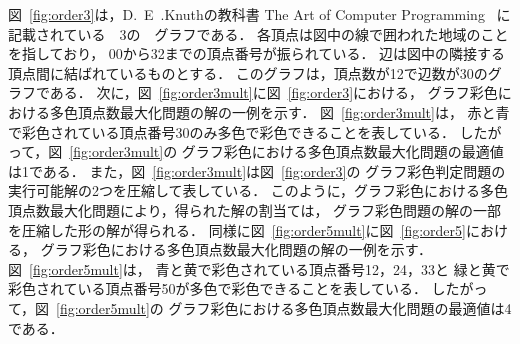 図~\ref{fig:order3}は，D.~E~.Knuthの教科書
The Art of Computer Programming~\cite{Knuth:TAOCP:SAT}
に記載されている~~3の~~グラフである．
各頂点は図中の線で囲われた地域のことを指しており，
00から32までの頂点番号が振られている．
辺は図中の隣接する頂点間に結ばれているものとする．
このグラフは，頂点数が12で辺数が30のグラフである．
次に，図~\ref{fig:order3mult}に図~\ref{fig:order3}における，
グラフ彩色における多色頂点数最大化問題の解の一例を示す．
図~\ref{fig:order3mult}は，
赤と青で彩色されている頂点番号30のみ多色で彩色できることを表している．
したがって，図~\ref{fig:order3mult}の
グラフ彩色における多色頂点数最大化問題の最適値は1である．
また，図~\ref{fig:order3mult}は図~\ref{fig:order3}の
グラフ彩色判定問題の実行可能解の2つを圧縮して表している．
このように，グラフ彩色における多色頂点数最大化問題により，得られた解の割当ては，
グラフ彩色問題の解の一部を圧縮した形の解が得られる．
同様に図~\ref{fig:order5mult}に図~\ref{fig:order5}における，
グラフ彩色における多色頂点数最大化問題の解の一例を示す．
図~\ref{fig:order5mult}は，
青と黄で彩色されている頂点番号12，24，33と
緑と黄で彩色されている頂点番号50が多色で彩色できることを表している．
したがって，図~\ref{fig:order5mult}の
グラフ彩色における多色頂点数最大化問題の最適値は4である．


